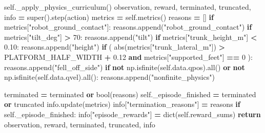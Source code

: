 \documentclass[
  american,
  11pt,
  letterpaper,
]{article}
\newenvironment{Shaded}{\begin{snugshade}}{\end{snugshade}}
\newcommand{\BuiltInTok}[1]{#1}
\newcommand{\ControlFlowTok}[1]{\textcolor[rgb]{0.13,0.29,0.53}{\textbf{#1}}}
\newcommand{\DecValTok}[1]{\textcolor[rgb]{0.00,0.00,0.81}{#1}}
\newcommand{\FloatTok}[1]{\textcolor[rgb]{0.00,0.00,0.81}{#1}}
\newcommand{\KeywordTok}[1]{\textcolor[rgb]{0.13,0.29,0.53}{\textbf{#1}}}
\newcommand{\NormalTok}[1]{#1}
\newcommand{\OperatorTok}[1]{\textcolor[rgb]{0.81,0.36,0.00}{\textbf{#1}}}
\newcommand{\StringTok}[1]{\textcolor[rgb]{0.31,0.60,0.02}{#1}}
\newcommand{\VariableTok}[1]{\textcolor[rgb]{0.00,0.00,0.00}{#1}}
\renewenvironment{Shaded}{\par\smallskip}{\par\smallskip}
\begin{document}
\begin{Shaded}
\begin{Highlighting}[]
        \VariableTok{self}\NormalTok{.\_apply\_physics\_curriculum()}
\NormalTok{        observation, reward, terminated, truncated, info }\OperatorTok{=} \BuiltInTok{super}\NormalTok{().step(action)}
\NormalTok{        metrics }\OperatorTok{=} \VariableTok{self}\NormalTok{.metrics()}
\NormalTok{        reasons }\OperatorTok{=}\NormalTok{ []}
        \ControlFlowTok{if}\NormalTok{ metrics[}\StringTok{"robot\_ground\_contact"}\NormalTok{]:}
\NormalTok{            reasons.append(}\StringTok{"robot\_ground\_contact"}\NormalTok{)}
        \ControlFlowTok{if}\NormalTok{ metrics[}\StringTok{"tilt\_deg"}\NormalTok{] }\OperatorTok{\textgreater{}} \DecValTok{70}\NormalTok{:}
\NormalTok{            reasons.append(}\StringTok{"tilt"}\NormalTok{)}
        \ControlFlowTok{if}\NormalTok{ metrics[}\StringTok{"trunk\_height\_m"}\NormalTok{] }\OperatorTok{\textless{}} \FloatTok{0.10}\NormalTok{:}
\NormalTok{            reasons.append(}\StringTok{"height"}\NormalTok{)}
        \ControlFlowTok{if}\NormalTok{ (}
            \BuiltInTok{abs}\NormalTok{(metrics[}\StringTok{"trunk\_lateral\_m"}\NormalTok{]) }\OperatorTok{\textgreater{}}\NormalTok{ PLATFORM\_HALF\_WIDTH }\OperatorTok{+} \FloatTok{0.12}
            \KeywordTok{and}\NormalTok{ metrics[}\StringTok{"supported\_feet"}\NormalTok{] }\OperatorTok{==} \DecValTok{0}
\NormalTok{        ):}
\NormalTok{            reasons.append(}\StringTok{"fell\_off\_side"}\NormalTok{)}
        \ControlFlowTok{if} \KeywordTok{not}\NormalTok{ np.isfinite(}\VariableTok{self}\NormalTok{.data.qpos).}\BuiltInTok{all}\NormalTok{() }\KeywordTok{or} \KeywordTok{not}\NormalTok{ np.isfinite(}\VariableTok{self}\NormalTok{.data.qvel).}\BuiltInTok{all}\NormalTok{():}
\NormalTok{            reasons.append(}\StringTok{"nonfinite\_physics"}\NormalTok{)}

\NormalTok{        terminated }\OperatorTok{=}\NormalTok{ terminated }\KeywordTok{or} \BuiltInTok{bool}\NormalTok{(reasons)}
        \VariableTok{self}\NormalTok{.\_episode\_finished }\OperatorTok{=}\NormalTok{ terminated }\KeywordTok{or}\NormalTok{ truncated}
\NormalTok{        info.update(metrics)}
\NormalTok{        info[}\StringTok{"termination\_reasons"}\NormalTok{] }\OperatorTok{=}\NormalTok{ reasons}
        \ControlFlowTok{if} \VariableTok{self}\NormalTok{.\_episode\_finished:}
\NormalTok{            info[}\StringTok{"episode\_rewards"}\NormalTok{] }\OperatorTok{=} \BuiltInTok{dict}\NormalTok{(}\VariableTok{self}\NormalTok{.reward\_sums)}
        \ControlFlowTok{return}\NormalTok{ observation, reward, terminated, truncated, info}


\end{Highlighting}
\end{Shaded}
\end{document}
